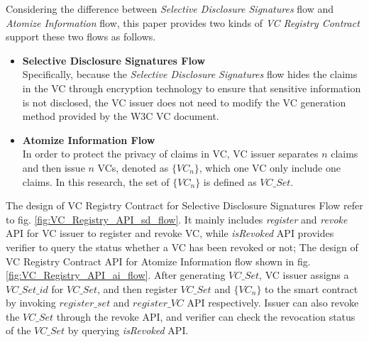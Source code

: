 \documentclass[conference, dvipdfmx]{IEEEtran} %
\begin{document}
\begin{sloppypar}
Considering the difference between \textit{Selective Disclosure Signatures} flow and \textit{Atomize Information} flow, this paper provides two kinds of \textit{VC Registry Contract} support these two flows as follows.
\begin{itemize}
  \item 	\textbf{Selective Disclosure Signatures Flow}\\
  Specifically, because the \textit{Selective Disclosure Signatures} flow hides the claims in the VC through encryption technology to ensure that sensitive information is not disclosed, the VC issuer does not need to modify the VC generation method provided by the W3C VC document.
  \item \textbf{Atomize Information Flow}\\
  In order to protect the privacy of claims in VC, VC issuer separates $n$ claims and then issue $n$ VCs, denoted as $\{VC_n\}$,  which one VC only include one claims. In this research, the set of $\{VC_n\}$ is defined as $VC\_Set$.
\end{itemize}

The design of VC Registry Contract for Selective Disclosure Signatures Flow refer to fig. \ref{fig:VC_Registry_API_sd_flow}.  It mainly includes \textit{register} and \textit{revoke} API for VC issuer to register and revoke VC, while \textit{isRevoked} API provides verifier to query the status whether a VC has been revoked or not;
The design of VC Registry Contract API for Atomize Information flow shown in fig. \ref{fig:VC_Registry_API_ai_flow}. After generating $VC\_Set$, VC issuer assigns a $VC\_Set\_id$ for $VC\_Set$, and then register $VC\_Set$ and $\{VC_n\}$ to the smart contract by invoking $register\_set$ and $register\_VC$ API respectively. 
Issuer can also revoke the $VC\_Set$ through the revoke API, and verifier can check the revocation status of the $VC\_Set$ by querying \textit{isRevoked} API.


\end{sloppypar}
\end{document}
